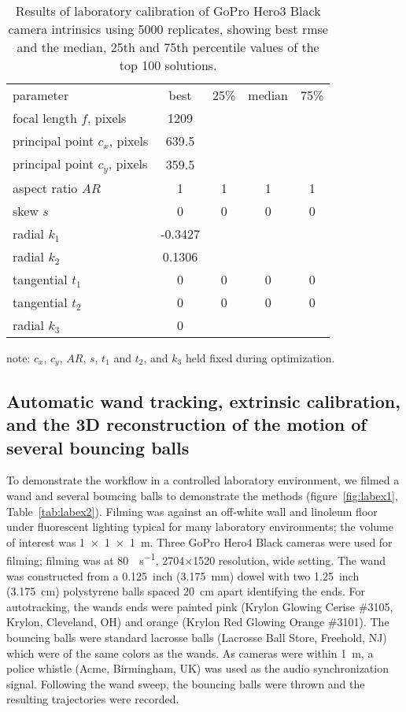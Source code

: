 \documentclass[fleqn,10pt]{wlpeerj}
\begin{document}
\begin{table}
\caption{Results of laboratory calibration of GoPro Hero3 Black camera intrinsics using 5000 replicates, showing best rmse and the median, 25th and 75th percentile values of the top 100 solutions. 
}
\label{tab:labcal2}
\begin{center}
\begin{tabular}{lcccc}
parameter & best & 25\% & median & 75\% \\
\cline{1-5}
focal length $f$, pixels & 1209 & & &\\
principal point $c_x$, pixels & 639.5 & & & \\
principal point $c_y$, pixels & 359.5 & & & \\
aspect ratio $AR$ & 1 & 1 & 1 & 1\\skew $s$ & 0 & 0 & 0 & 0 \\
radial $k_1$ & -0.3427 & & & \\
radial $k_2$ & 0.1306 & & & \\
tangential $t_1$ & 0 & 0 & 0 & 0 \\
tangential $t_2$ & 0 & 0 & 0 & 0 \\
radial $k_3$ & 0 & & & \\
\end{tabular}
\end{center}
note: $c_x$, $c_y$, $AR$, $s$, $t_1$ and $t_2$, and $k_3$ held fixed during optimization.
\end{table}








\subsection*{Automatic wand tracking, extrinsic calibration, and the 3D reconstruction of the motion of several bouncing balls}
To demonstrate the workflow in a controlled laboratory environment, we filmed a wand and several bouncing balls to demonstrate the methods (figure~\ref{fig:labex1}, Table~\ref{tab:labex2}).  Filming was against an off-white wall and linoleum floor under fluorescent lighting typical for many laboratory environments; the volume of interest was \SI{1x1x1}{\meter}.  Three GoPro Hero4 Black cameras were used for filming; filming was at \SI{80}{\frame\per\second}, 2704$\times$1520 resolution, wide setting.  The wand was constructed from a \SI{0.125}{inch} (\SI{3.175}{\milli\meter}) dowel with two \SI{1.25}{inch} (\SI{3.175}{\centi\meter}) polystyrene balls spaced \SI{20}{\centi\meter} apart identifying the ends. For autotracking, the wands ends were painted pink (Krylon Glowing Cerise \#3105, Krylon, Cleveland, OH) and orange (Krylon Red Glowing Orange \#3101).  The bouncing balls were standard lacrosse balls (Lacrosse Ball Store, Freehold, NJ) which were of the same colors as the wands.  As cameras were within \SI{1}{\meter}, a police whistle (Acme, Birmingham, UK) was used as the audio synchronization signal.  Following the wand sweep, the bouncing balls were thrown and the resulting trajectories were recorded.  
\end{document}
